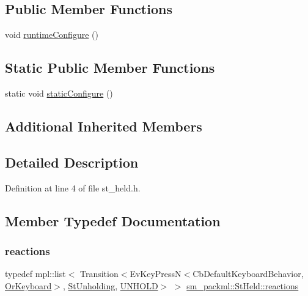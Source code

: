 \subsection*{Public Member Functions}
\begin{DoxyCompactItemize}
\item 
void \hyperlink{structsm__packml_1_1StHeld_a718472ff6cb7dad6febe341dc8e06302}{runtime\+Configure} ()
\end{DoxyCompactItemize}
\subsection*{Static Public Member Functions}
\begin{DoxyCompactItemize}
\item 
static void \hyperlink{structsm__packml_1_1StHeld_a9726a9afc007dbe38e5adcec3df6511e}{static\+Configure} ()
\end{DoxyCompactItemize}
\subsection*{Additional Inherited Members}


\subsection{Detailed Description}


Definition at line 4 of file st\+\_\+held.\+h.



\subsection{Member Typedef Documentation}
\mbox{\label{structsm__packml_1_1StHeld_a808a22c5c16ab47ef30db3c477b8d543}} 
\subsubsection{\texorpdfstring{reactions}{reactions}}
{\footnotesize\ttfamily typedef mpl\+::list$<$ Transition$<$Ev\+Key\+PressN$<$Cb\+Default\+Keyboard\+Behavior, \hyperlink{classsm__packml_1_1OrKeyboard}{Or\+Keyboard}$>$, \hyperlink{structsm__packml_1_1StUnholding}{St\+Unholding}, \hyperlink{structsm__packml_1_1StHeld_1_1UNHOLD}{U\+N\+H\+O\+LD}$>$ $>$ \hyperlink{structsm__packml_1_1StHeld_a808a22c5c16ab47ef30db3c477b8d543}{sm\+\_\+packml\+::\+St\+Held\+::reactions}}



